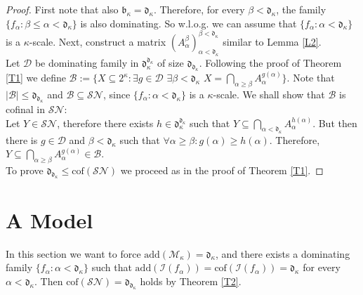 \documentclass[12pt,a4paper]{scrartcl}
\theoremstyle{definition}
\numberwithin{equation}{section}
\begin{document}
\begin{proof}
First note that also $\mathfrak{b}_\kappa=\mathfrak{d}_\kappa$. Therefore, for every $\beta < \mathfrak{d}_\kappa$, the family $\{f_\alpha \colon \beta \leq \alpha < \mathfrak{d}_\kappa\}$ is also dominating. So w.l.o.g. we can assume that $\{f_\alpha \colon \alpha < \mathfrak{d}_\kappa\}$ is a $\kappa$-scale. Next, construct a matrix $(A_\alpha ^\beta)_{\alpha <\mathfrak{d}_\kappa} ^{\beta < \mathfrak{d}_\kappa}$ similar to Lemma \ref{L2}.\\
Let $\mathcal{D}$ be dominating family in $\mathfrak{d}_\kappa^{\mathfrak{d}_\kappa}$ of size $\mathfrak{d}_{\mathfrak{d}_\kappa}$. Following the proof of Theorem \ref{T1} we define $\mathcal{B}:=\{ X \subseteq 2^\kappa \colon \exists g \in \mathcal{D} \,\, \exists \beta < \mathfrak{d}_\kappa \, \, X=\bigcap_{\alpha \geq \beta} A_\alpha^{g(\alpha)} \}$. Note that $\vert \mathcal{B} \vert\leq \mathfrak{d}_{\mathfrak{d}_\kappa}$ and $\mathcal{B} \subseteq \mathcal{SN}$, since $\{f_\alpha \colon \alpha < \mathfrak{d}_\kappa\}$ is a $\kappa$-scale. We shall show that $\mathcal{B}$ is cofinal in $\mathcal{SN}$:\\
Let $Y \in \mathcal{SN}$, therefore there exists $h \in \mathfrak{d}_\kappa^{\mathfrak{d}_\kappa}$ such that $Y \subseteq \bigcap_{\alpha <\mathfrak{d}_\kappa} A_\alpha^{h(\alpha)}$. But then there is $g \in \mathcal{D}$ and $\beta < \mathfrak{d}_\kappa$ such that $\forall \alpha \geq \beta \colon g(\alpha) \geq h(\alpha)$. Therefore, $Y \subseteq  \bigcap_{\alpha \geq \beta} A_\alpha^{g(\alpha)} \in \mathcal{B}$.\\
To prove $\mathfrak{d}_{\mathfrak{d}_\kappa} \leq \text{cof}(\mathcal{SN})$ we proceed as in the proof of Theorem \ref{T1}.
\end{proof}


\section{A Model}

In this section we want to force $\text{add}(\mathcal{M}_\kappa)=\mathfrak{d}_\kappa$, and there exists a dominating family $\{f_\alpha \colon \alpha < \mathfrak{d}_\kappa\}$ such that $\text{add}(\mathcal{I}(f_\alpha))=\text{cof}(\mathcal{I}(f_\alpha)) =\mathfrak{d}_\kappa$ for every $\alpha < \mathfrak{d}_\kappa$. Then $\text{cof}(\mathcal{SN})= \mathfrak{d}_{\mathfrak{d}_\kappa}$ holds by Theorem \ref{T2}.
\end{document}
